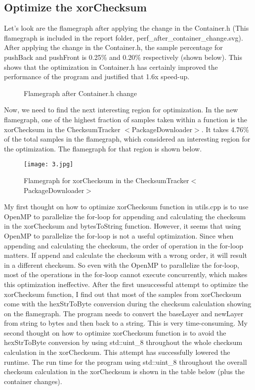 \documentclass[12pt]{article}
\begin{document}
\newpage
\subsection{Optimize the xorChecksum}
\noindent
Let's look are the flamegraph after applying the change in the Container.h (This flamegraph is included in the report folder, perf\_after\_container\_change.svg). After applying the change in the Container.h, the sample percentage for pushBack and pushFront is 0.25\% and 0.20\% respectively (shown below). This shows that the optimization in Container.h has certainly improved the performance of the program and justified that 1.6x speed-up.

\begin{figure}[htb!]
  \centering
  \hfill
  \caption{Flamegraph after Container.h change}
\end{figure}

\noindent
Now, we need to find the next interesting region for optimization. In the new flamegraph, one of the highest fraction of samples taken within a function is the xorChecksum in the ChecksumTracker $<$PackageDownloader$>$. It takes 4.76\% of the total samples in the flamegraph, which considered an interesting region for the optimization. The flamegraph for that region is shown below.

\begin{figure}[htb!]
  \centering
  \texttt{[image: 3.jpg]}
  \caption{Flamegraph for xorChecksum in the ChecksumTracker$<$PackageDownloader$>$}
\end{figure}

\noindent
My first thought on how to optimize xorChecksum function in utils.cpp is to use OpenMP to parallelize the for-loop for appending and calculating the checksum in the xorChecksum and bytesToString function. However, it seems that using OpenMP to parallelize the for-loop is not a useful optimization. Since when appending and calculating the checksum, the order of operation in the for-loop matters. If append and calculate the checksum with a wrong order, it will result in a different checksum. So even with the OpenMP to parallelize the for-loop, most of the operations in the for-loop cannot execute concurrently, which makes this optimization ineffective. After the first unsuccessful attempt to optimize the xorChecksum function, I find out that most of the samples from xorChecksum come with the hexStrToByte conversion during the checksum calculation showing on the flamegraph. The program needs to convert the baseLayer and newLayer from string to bytes and then back to a string. This is very time-consuming. My second thought on how to optimize xorChecksum function is to avoid the hexStrToByte conversion by using std::uint\_8 throughout the whole checksum calculation in the xorChecksum. This attempt has successfully lowered the runtime. The run time for the program using std::uint\_8 throughout the overall checksum calculation in the xorChecksum is shown in the table below (plus the container changes).
\end{document}
